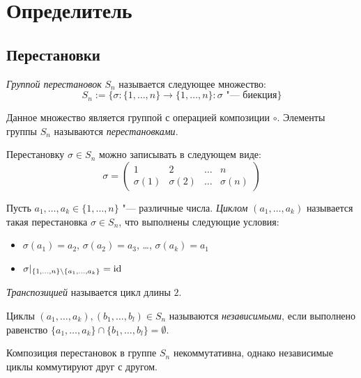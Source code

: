 \section{Определитель}

\subsection{Перестановки}

\begin{definition}
	\textit{Группой перестановок} $S_n$ называется следующее множество:
	\[S_n := \{\sigma: \{1,\dots, n\} \rightarrow \{1,\dots, n\}: \sigma \text{ "--- биекция}\}\]
	
	Данное множество является группой с операцией композиции $\circ$. Элементы группы $S_n$ называются \textit{перестановками}.
\end{definition}

\begin{note}
	Перестановку $\sigma \in S_n$ можно записывать в следующем виде:
	\[\sigma = \begin{pmatrix}
	1&2&\dots&n\\
	\sigma(1)&\sigma(2)&\dots&\sigma(n)
	\end{pmatrix}\]
\end{note}

\begin{definition}
	Пусть $a_1, \dots , a_k \in \{1, \dots, n\}$ "--- различные числа. \textit{Циклом} $(a_1, \dots , a_k)$ называется такая перестановка $\sigma \in S_n$, что выполнены следующие условия:
	\begin{itemize}
		\item $\sigma(a_1) = a_2$, $\sigma(a_2) = a_3$, \dots, $\sigma(a_k) = a_1$
		\item $\sigma|_{\{1, \dots, n\} \backslash \{a_1, \dots , a_k\}} = \mathrm{id}$
	\end{itemize}

	\textit{Транспозицией} называется цикл длины $2$.
\end{definition}

\begin{definition}
	Циклы $(a_1, \dots , a_k), (b_1, \dots , b_l) \in S_n$ называются \textit{независимыми}, если выполнено равенство $\{a_1, \dots , a_k\} \cap \{b_1, \dots , b_l\} = \emptyset$.
\end{definition}

\begin{note}
	Композиция перестановок в группе $S_n$ некоммутативна, однако независимые циклы коммутируют друг с другом.
\end{note}

